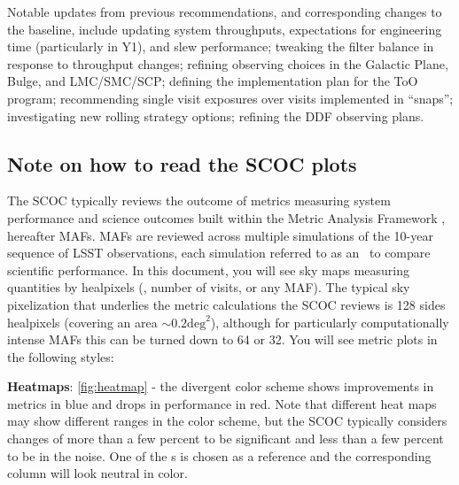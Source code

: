 Notable updates from previous recommendations, and corresponding changes to the baseline, include updating system throughputs,  expectations for engineering time (particularly in Y1), and slew performance; tweaking the filter balance in response to throughput changes; refining observing choices in the Galactic Plane, Bulge, and LMC/SMC/SCP; defining the implementation plan for the ToO program; recommending single visit exposures over visits implemented in ``snaps''; investigating new rolling strategy options; refining the DDF observing plans.


\subsection{Note on how to read the SCOC plots}

The SCOC typically reviews the outcome of metrics measuring system performance and science outcomes built within the Metric Analysis Framework \citep{2014SPIE.9149E..0BJ}, hereafter MAFs. MAFs are reviewed across multiple simulations of the 10-year sequence of LSST observations, each simulation referred to as an \opsim\, to compare scientific performance. In this document, you will see sky maps measuring quantities by healpixels (\eg, number of visits, or any MAF). The typical sky pixelization that underlies the metric calculations the SCOC reviews is 128 sides healpixels (covering an area $\sim 0.2\mathrm{deg}^2$), although for particularly computationally intense MAFs this can be turned down to 64 or 32. You will see metric plots in the following styles: 



{\bf Heatmaps}: \autoref{fig:heatmap} -
the divergent color scheme shows improvements in metrics in blue and drops in performance in red. Note that different heat maps may show different ranges in the color scheme, but the SCOC typically considers changes of more than a few percent to be significant and less than a few percent to be in the noise. One of the \opsim s is chosen as a reference and the corresponding column will look neutral in color.

